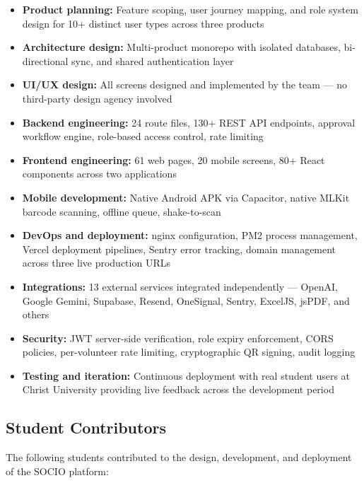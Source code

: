 \documentclass[12pt,a4paper]{article}
\begin{document}
\begin{itemize}[leftmargin=*]
    \item \textbf{Product planning:} Feature scoping, user journey mapping, and role system design for 10+ distinct user types across three products
    \item \textbf{Architecture design:} Multi-product monorepo with isolated databases, bi-directional sync, and shared authentication layer
    \item \textbf{UI/UX design:} All screens designed and implemented by the team — no third-party design agency involved
    \item \textbf{Backend engineering:} 24 route files, 130+ REST API endpoints, approval workflow engine, role-based access control, rate limiting
    \item \textbf{Frontend engineering:} 61 web pages, 20 mobile screens, 80+ React components across two applications
    \item \textbf{Mobile development:} Native Android APK via Capacitor, native MLKit barcode scanning, offline queue, shake-to-scan
    \item \textbf{DevOps and deployment:} nginx configuration, PM2 process management, Vercel deployment pipelines, Sentry error tracking, domain management across three live production URLs
    \item \textbf{Integrations:} 13 external services integrated independently — OpenAI, Google Gemini, Supabase, Resend, OneSignal, Sentry, ExcelJS, jsPDF, and others
    \item \textbf{Security:} JWT server-side verification, role expiry enforcement, CORS policies, per-volunteer rate limiting, cryptographic QR signing, audit logging
    \item \textbf{Testing and iteration:} Continuous deployment with real student users at Christ University providing live feedback across the development period
\end{itemize}

\subsection{Student Contributors}

The following students contributed to the design, development, and deployment of the SOCIO platform:
\end{document}
